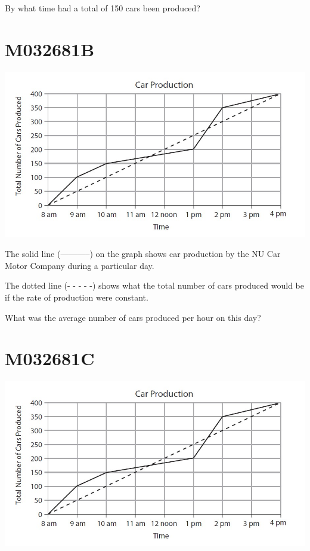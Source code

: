 \documentclass[12pt]{article}
\begin{document}
By what time had a total of 150 cars been produced?

\newpage
\section*{M032681B}

\includegraphics[max width=\textwidth]{2024_02_20_828ebc9d68bcc1fbb223g-73}

The solid line (-----------) on the graph shows car production by the NU Car Motor Company during a particular day.

The dotted line (- - - - -) shows what the total number of cars produced would be if the rate of production were constant.

What was the average number of cars produced per hour on this day?

\newpage
\section*{M032681C}

\includegraphics[max width=\textwidth]{2024_02_20_828ebc9d68bcc1fbb223g-73}
\end{document}
